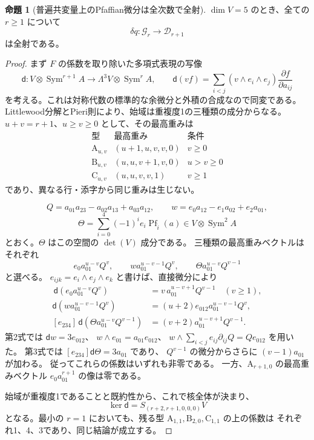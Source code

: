\documentclass[a4paper,11pt]{ltjsarticle}
\theoremstyle{definition}
\newtheorem{proposition}[theorem]{命題}
\begin{document}
\begin{proposition}[普遍共変量上のPfaffian微分は全次数で全射]
\label{prop:v12-uniform-pfaffian-surjectivity}
$\dim V=5$ のとき、全ての $r\ge1$ について
\[
 \delta q:\mathcal G_r\longrightarrow\mathcal D_{r+1}
\]
は全射である。
\end{proposition}
\begin{proof}
まず $F$ の係数を取り除いた多項式表現の写像
\[
 \mathsf d:V\otimes\operatorname{Sym}^{r+1}A
       \longrightarrow\Lambda^3V\otimes\operatorname{Sym}^r A,
 \qquad
 \mathsf d(vf)=\sum_{i<j}(v\wedge e_i\wedge e_j)
                   \frac{\partial f}{\partial a_{ij}}
\]
を考える。これは対称代数の標準的な余微分と外積の合成なので同変である。
Littlewood分解とPieri則により、始域は重複度1の三種類の成分からなる。
$u+v=r+1$、$u\ge v\ge0$ として、その最高重みは
\[
\begin{array}{c|c|c}
 \text{型}&\text{最高重み}&\text{条件}\\\hline
 \mathrm A_{u,v}&(u+1,u,v,v,0)&v\ge0\\
 \mathrm B_{u,v}&(u,u,v+1,v,0)&u>v\ge0\\
 \mathrm C_{u,v}&(u,u,v,v,1)&v\ge1
\end{array}
\]
であり、異なる行・添字から同じ重みは生じない。

\[
 Q=a_{01}a_{23}-a_{02}a_{13}+a_{03}a_{12},\qquad
 w=e_0a_{12}-e_1a_{02}+e_2a_{01},
\]
\[
 \Theta=\sum_{i=0}^4(-1)^i e_i\operatorname{Pf}_{\widehat i}(a)
       \in V\otimes\operatorname{Sym}^2A
\]
とおく。$\Theta$ はこの空間の $\det(V)$ 成分である。
三種類の最高重みベクトルはそれぞれ
\[
 e_0a_{01}^{u-v}Q^v,\qquad
 wa_{01}^{u-v-1}Q^v,\qquad
 \Theta a_{01}^{u-v}Q^{v-1}
\]
と選べる。
$e_{ijk}=e_i\wedge e_j\wedge e_k$ と書けば、直接微分により
\begin{align*}
 [e_{023}]\,\mathsf d(e_0a_{01}^{u-v}Q^v)
  &=v\,a_{01}^{u-v+1}Q^{v-1}\quad(v\ge1),\\
 \mathsf d(wa_{01}^{u-v-1}Q^v)
  &=(u+2)e_{012}a_{01}^{u-v-1}Q^v,\\
 [e_{234}]\,\mathsf d(\Theta a_{01}^{u-v}Q^{v-1})
  &=(v+2)a_{01}^{u-v+1}Q^{v-1}.
\end{align*}
第2式では $\mathsf dw=3e_{012}$、
$w\wedge e_{01}=a_{01}e_{012}$、
$w\wedge\sum_{i<j}e_{ij}\partial_{ij}Q=Qe_{012}$ を用いた。
第3式では $[e_{234}]\mathsf d\Theta=3a_{01}$ であり、
$Q^{v-1}$ の微分からさらに $(v-1)a_{01}$ が加わる。
従ってこれらの係数はいずれも非零である。
一方、$\mathrm A_{r+1,0}$ の最高重みベクトル
$e_0a_{01}^{r+1}$ の像は零である。

始域が重複度1であることと既約性から、これで核全体が決まり、
\begin{equation}\label{eq:v12-uniform-pfaffian-kernel}
 \ker\mathsf d=S_{(r+2,r+1,0,0,0)}V
\end{equation}
となる。最小の $r=1$ においても、残る型
$\mathrm A_{1,1},\mathrm B_{2,0},\mathrm C_{1,1}$ の上の係数は
 それぞれ1、4、3であり、同じ結論が成立する。


\end{proof}
\end{document}
